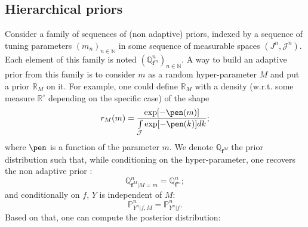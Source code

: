 \subsection{Hierarchical priors}\label{2.5.2}
Consider a family of sequences of (non adaptive) priors, indexed by a sequence of tuning parameters $\left(m_{n}\right)_{n \in \mathds{N}}$ in some sequence of measurable spaces $\left(J^{n}, \mathcal{J}^{n}\right)$.
Each element of this family is noted $\left(\mathds{Q}_{\boldsymbol{f}^{m}}^{n}\right)_{n \in \mathds{N}}$.
A way to build an adaptive prior from this family is to consider $m$ as a random hyper-parameter $M$ and put a prior $\mathds{R}_{M}$ on it.
For example, one could define $\mathds{R}_{M}$ with a density (w.r.t. some measure $\mathds{R}^{\circ}$ depending on the specific case) of the shape
\[r_{M}(m) = \frac{\exp[- \pen(m)]}{\int\limits_{\mathcal{J}}\exp[- \pen(k)] dk};\]
where $\pen$ is a function of the parameter $m$.
We denote $\mathds{Q}_{\boldsymbol{f}^{M}}$ the prior distribution such that, while conditioning on the hyper-parameter, one recovers the non adaptive prior :
\[\mathds{Q}_{\boldsymbol{f}^{M} \vert M = m}^{n} = \mathds{Q}_{\boldsymbol{f}^{m}}^{n};\]
and conditionally on $f$, $Y$ is independent of $M$:
\[\mathds{P}_{Y^{n}\vert f, M}^{n} = \mathds{P}_{Y^{n}\vert f}^{n}.\]
Based on that, one can compute the posterior distribution:
